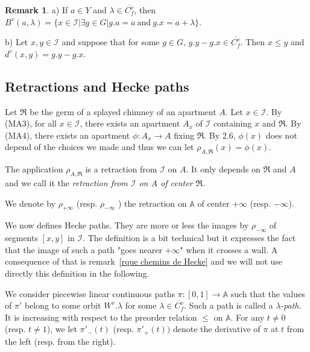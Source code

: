 \documentclass[12pt]{article}
\theoremstyle{plain}
\theoremstyle{definition}
\newtheorem{rque}[thm]{Remark}
\newcommand{\A}{\mathbb{A}}
\newcommand{\I}{\mathcal{I}}
\begin{document}
\begin{rque}\label{rque caractérisation distance vectorielle}
a) If $a\in Y$ and $\lambda\in \overline{C_f^v}$, then $B^v(a,\lambda)=\{x\in \I|\exists g\in G|g.a=a\mathrm{\ and\ }g.x=a+\lambda\}$.

b) Let $x,y\in \I$ and suppose that for some $g\in G$, $g.y-g.x\in \overline{C_f^v}$. Then $x\leq y$ and $d^v(x,y)=g.y-g.x$.
\end{rque}

\subsection{Retractions and Hecke paths}


Let  $\mathfrak{R}$ be the germ of a splayed chimney of an apartment $A$. Let $x\in \I$. By (MA3), for all $x\in \I$, there exists an apartment $A_x$ of $\I$ containing $x$ and $\mathfrak{R}$. By (MA4), there exists an apartment $\phi:A_x\rightarrow A$ fixing $\mathfrak{R}$. By \cite{rousseau2011masures} 2.6, $\phi(x)$ does not depend of the choices we made and thus we can let $\rho_{A,\mathfrak{R}}(x)=\phi(x)$.

The application $\rho_{A,\mathfrak{R}}$ is a retraction from $\I$ on $A$. It only depends on $\mathfrak{R}$ and $A$ and we call it the \textit{retraction from $\I$ on $A$ of center $\mathfrak{R}$}. 

We denote by $\rho_{+\infty}$ (resp. $\rho_{-\infty}$ ) the retraction on $\A$ of center $+\infty$ (resp. $-\infty$).

We now defines Hecke paths. They are more or less the images by $\rho_{-\infty}$ of segments $[x,y]$ in $\I$. The definition is a bit technical but it expresses the fact that the image of such a path "goes nearer $+\infty$" when it crosses a wall. A consequence of that is remark~\ref{rque chemins de Hecke} and we will not use directly this definition in the following.

 We consider piecewise linear continuous paths $\pi:[0,1]\rightarrow \A$ such that the values  of $\pi'$ belong to some orbit $W^v.\lambda$ for some $\lambda\in \overline{C_f^v}$. Such a path is called a $\lambda$-\textit{path}. It is increasing with respect to the preorder relation $\leq$ on $\A$. For any $t\neq 0$ (resp. $t\neq 1$), we let $\pi'_-(t)$ (resp. $\pi'_+(t))$ denote the derivative of $\pi$ at $t$ from the left (resp. from the right).
\end{document}
